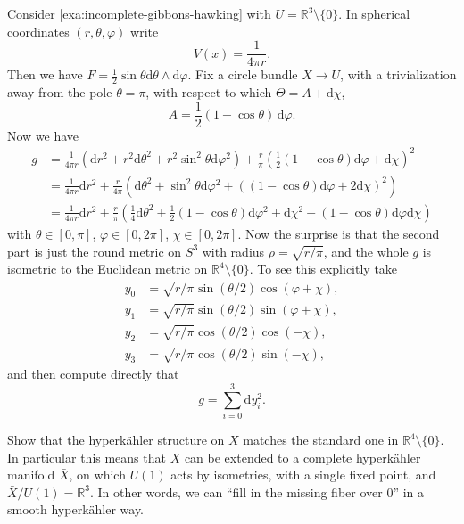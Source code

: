 \documentclass[12pt,letterpaper,reqno]{amsart}
\numberwithin{equation}{section}
\newcommand{\R}{\ensuremath{\mathbb R}}
\newcommand{\half}{\ensuremath{\frac{1}{2}}}
\newcommand{\qtr}{\ensuremath{\frac{1}{4}}}
\newcommand{\hk}{hyperk\"ahler\xspace}
\newcommand{\de}{\mathrm{d}}
\newcommand{\fixme}[1]{{\color{blue}{[#1]}}}
\begin{document}
\begin{example}[$\R^4$ as a Gibbons-Hawking space] \label{exa:gibbons-hawking-R4}
Consider \autoref{exa:incomplete-gibbons-hawking} with
$U = \R^3 \setminus \{0\}$. In spherical coordinates
$(r,\theta,\varphi)$ write
\begin{equation}
 V(x) = \frac{1}{4\pi r}.
\end{equation}
Then we have $F = \half \sin \theta \de \theta \wedge \de \varphi$.
Fix a circle bundle $X \to U$, with a trivialization away 
from the pole $\theta = \pi$, 
with respect to which $\Theta = A + \de \chi$,
\begin{equation}
  A = \half(1 - \cos \theta) \, \de \varphi.
\end{equation}
Now we have 
\begin{align}
  g &= \frac{1}{4 \pi r} (\de r^2 + r^2 \de \theta^2 + r^2 \sin^2 \theta \de \varphi^2) + \frac{r}{\pi} \left(\half (1-\cos \theta) \de \varphi + \de \chi\right)^2 \\
  &= \frac{1}{4 \pi r} \de r^2 + \frac{r}{4 \pi} (\de \theta^2 + \sin^2 \theta \de \varphi^2 + ((1 - \cos \theta) \de \varphi + 2 \de \chi)^2) \\
  &= \frac{1}{4 \pi r} \de r^2 + \frac{r}{\pi} \left(\qtr \de \theta^2 + \half(1-\cos\theta) \de \varphi^2 + \de \chi^2 + (1-\cos \theta) \de \varphi \de \chi\right)  
\end{align}
with $\theta \in [0,\pi]$, $\varphi \in [0,2\pi]$, $\chi \in [0,2\pi]$.
Now the surprise is that the second part is just the round 
metric on $S^3$ with radius $\rho = \sqrt{r/\pi}$, 
and the whole $g$ is isometric to 
the Euclidean metric on $\R^4 \setminus \{0\}$.
To see this explicitly take \fixme{check ordering}
\begin{align}
  y_0 &= \sqrt{r/\pi} \sin(\theta/2) \cos\left(\varphi + \chi\right), \\
  y_1 &= \sqrt{r/\pi} \sin(\theta/2) \sin\left(\varphi + \chi\right), \\
  y_2 &= \sqrt{r/\pi} \cos(\theta/2) \cos\left(-\chi\right), \\
  y_3 &= \sqrt{r/\pi} \cos(\theta/2) \sin\left(-\chi\right),
\end{align}
and then compute directly that
\begin{equation}
  g = \sum_{i=0}^3 \de y_i^2.
\end{equation}
\end{example}

\begin{exercise} \label{exc:gibbons-hawking-R4}
Show that the \hk structure on $X$ matches the standard one
in $\R^4 \setminus \{0\}$. In particular this means that 
$X$ can be extended
to a complete \hk manifold $\bar X$, 
on which $U(1)$ acts by isometries,
with a single fixed point,
and $\bar X / U(1) = \R^3$. In other words, we can ``fill in the missing fiber over $0$''
in a smooth \hk way.
\end{exercise}
\end{document}
